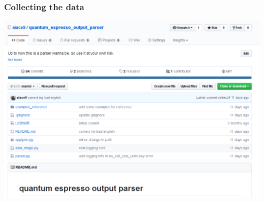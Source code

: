 \documentclass[12pt,notes=off,unicode]{beamer}
\begin{document}
    \begin{frame}[c]\frametitle{Collecting the data}
        
      \includegraphics[width=\textwidth]{img/git_qe_parser.png}
    
    \end{frame}
\end{document}
